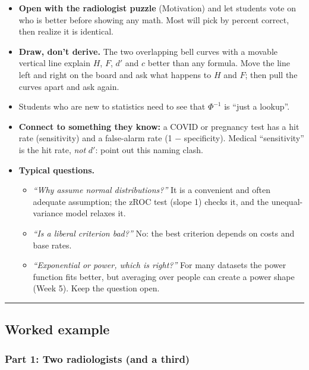 \begin{itemize}
\tightlist
\item
  \textbf{Open with the radiologist puzzle} (Motivation) and let
  students vote on who is better before showing any math. Most will pick
  by percent correct, then realize it is identical.
\item
  \textbf{Draw, don't derive.} The two overlapping bell curves with a
  movable vertical line explain \(H\), \(F\), \(d'\) and \(c\) better
  than any formula. Move the line left and right on the board and ask
  what happens to \(H\) and \(F\); then pull the curves apart and ask
  again.
\item
  Students who are new to statistics need to see that \(\Phi^{-1}\) is
  ``just a lookup''.
\item
  \textbf{Connect to something they know:} a COVID or pregnancy test has
  a hit rate (sensitivity) and a false-alarm rate (1 − specificity).
  Medical ``sensitivity'' is the hit rate, \emph{not} \(d'\): point out
  this naming clash.
\item
  \textbf{Typical questions.}

  \begin{itemize}
  \tightlist
  \item
    \emph{``Why assume normal distributions?''} It is a convenient and
    often adequate assumption; the zROC test (slope 1) checks it, and
    the unequal-variance model relaxes it.
  \item
    \emph{``Is a liberal criterion bad?''} No: the best criterion
    depends on costs and base rates.
  \item
    \emph{``Exponential or power, which is right?''} For many datasets
    the power function fits better, but averaging over people can create
    a power shape (Week 5). Keep the question open.
  \end{itemize}
\end{itemize}

\begin{center}\rule{0.5\linewidth}{0.5pt}\end{center}


\subsection{Worked example}

\subsubsection{Part 1: Two radiologists (and a third)}

